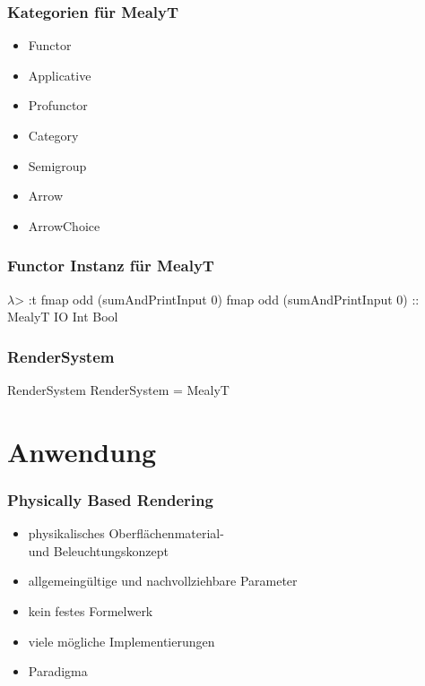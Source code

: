 \begin{frame}

  \frametitle{Kategorien für {\ttfamily MealyT}}

  \begin{itemize}
    \item {\ttfamily Functor}
    \item {\ttfamily Applicative}
    \item {\ttfamily Profunctor}
    \item {\ttfamily Category}
    \item {\ttfamily Semigroup}
    \item {\ttfamily Arrow}
    \item {\ttfamily ArrowChoice}
  \end{itemize}
\end{frame}

\begin{frame}[fragile]
  \frametitle{{\ttfamily Functor} Instanz für {\ttfamily MealyT}}

  \pause

  \begin{haskell}[mathescape, caption={[Anwndung Functor]Anwendung Functor}]
$\lambda$> :t fmap odd (sumAndPrintInput 0)
fmap odd (sumAndPrintInput 0) :: MealyT IO Int Bool
  \end{haskell}

\end{frame}

\begin{frame}
  \frametitle{\ttfamily RenderSystem}
  \begin{block}{\ttfamily RenderSystem}
    {\ttfamily RenderSystem} = {\ttfamily MealyT}
  \end{block}
\end{frame}

\section{Anwendung}
\frame{\sectionpage}
\begin{frame}
  \frametitle{Physically Based Rendering}
  \begin{itemize}
    \item<1-> {physikalisches Oberflächenmaterial- \\und Beleuchtungskonzept}
    \item<2-> {allgemeingültige und nachvollziehbare Parameter}
    \item<3-> {kein festes Formelwerk}
    \item<4-> {viele mögliche Implementierungen}
    \item<5-> {Paradigma}
  \end{itemize}
\end{frame}

